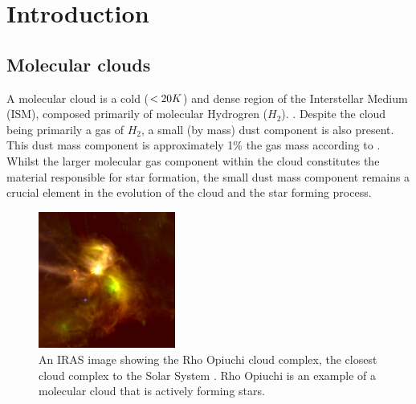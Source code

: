 \documentclass{report}
\begin{document}

\tableofcontents %
\pagebreak %

\listoffigures

\listoftables


\chapter{Introduction}

\section{Molecular clouds}
A molecular cloud is a cold ($<20\/K$) and dense region of the Interstellar Medium (ISM), composed primarily of molecular Hydrogren ($H_{2}$). \parencite{dustopacity}. Despite the cloud being primarily a gas of $H_{2}$, a small (by mass) dust component is also present. This dust mass component is approximately 1\% the gas mass according to \textcite{noise}. Whilst the larger molecular gas component within the cloud constitutes the material responsible for star formation, the small dust mass component remains a crucial element in the evolution of the cloud and the star forming process.

\begin{figure}
  \begin{center}
    \includegraphics[width=0.4\textwidth]{../img/rho.jpg}
    \caption[An IRAS image showing the Rho Opiuchi cloud complex, the closest cloud complex to the Solar System \parencite{rho}. Rho Opiuchi is an example of a molecular cloud that is actively forming stars.]{An IRAS image showing the Rho Opiuchi cloud complex, the closest cloud complex to the Solar System \parencite{rho}. Rho Opiuchi is an example of a molecular cloud that is actively forming stars.}
  \end{center}
\end{figure}  \label{fig:rho}
\end{document}
